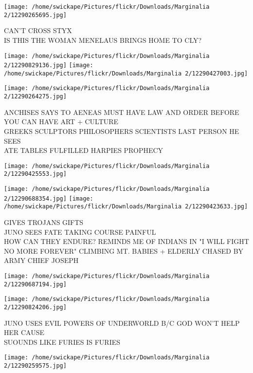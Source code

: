 \documentclass[10pt,letterpaper]{article}
\begin{document}
\vspace{0.25in}
\texttt{[image: /home/swickape/Pictures/flickr/Downloads/Marginalia 2/12290265695.jpg]}

CAN'T CROSS STYX\\
IS THIS THE WOMAN MENELAUS BRINGS HOME TO CLY?
\pagebreak

\texttt{[image: /home/swickape/Pictures/flickr/Downloads/Marginalia 2/12290829136.jpg]}
\texttt{[image: /home/swickape/Pictures/flickr/Downloads/Marginalia 2/12290427003.jpg]}

\vspace{0.25in}
\texttt{[image: /home/swickape/Pictures/flickr/Downloads/Marginalia 2/12290264275.jpg]}

ANCHISES SAYS TO AENEAS MUST HAVE LAW AND ORDER BEFORE YOU CAN HAVE ART + CULTURE\\
GREEKS SCULPTORS PHILOSOPHERS SCIENTISTS LAST PERSON HE SEES\\
ATE TABLES FULFILLED HARPIES PROPHECY
\pagebreak

\texttt{[image: /home/swickape/Pictures/flickr/Downloads/Marginalia 2/12290425553.jpg]}

\vspace{0.25in}
\texttt{[image: /home/swickape/Pictures/flickr/Downloads/Marginalia 2/12290688354.jpg]}
\texttt{[image: /home/swickape/Pictures/flickr/Downloads/Marginalia 2/12290423633.jpg]}

GIVES TROJANS GIFTS\\
JUNO SEES FATE TAKING COURSE PAINFUL\\
HOW CAN THEY ENDURE?  REMINDS ME OF INDIANS IN "I WILL FIGHT NO MORE FOREVER" CLIMBING MT. BABIES + ELDERLY CHASED BY ARMY CHIEF JOSEPH
\pagebreak

\texttt{[image: /home/swickape/Pictures/flickr/Downloads/Marginalia 2/12290687194.jpg]}

\vspace{0.25in}
\texttt{[image: /home/swickape/Pictures/flickr/Downloads/Marginalia 2/12290824206.jpg]}

JUNO USES EVIL POWERS OF UNDERWORLD B/C GOD WON'T HELP HER CAUSE\\
SUOUNDS LIKE FURIES IS FURIES
\pagebreak

\texttt{[image: /home/swickape/Pictures/flickr/Downloads/Marginalia 2/12290259575.jpg]}
\end{document}
